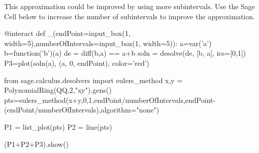 \documentclass{ximera}
\begin{document}
\begin{example}
 
This approximation could be improved by using more subintervals.  Use the Sage Cell below to increase the number of subintervals to improve the approximation.
 

\begin{sageCell}
@interact
def _(endPoint=input_box(1, width=5),numberOfIntervals=input_box(1, width=5)):
    a=var('a')
    b=function('b')(a)
    de = diff(b,a) ==  a+b
    soln = desolve(de, [b, a], ics=[0,1])
    P3=plot(soln(a), (a, 0, endPoint), color='red')

    from sage.calculus.desolvers import eulers_method
    x,y = PolynomialRing(QQ,2,"xy").gens()
    pts=eulers_method(x+y,0,1,endPoint/numberOfIntervals,endPoint-(endPoint/numberOfIntervals),algorithm="none")

    P1 = list_plot(pts)
    P2 = line(pts)

    (P1+P2+P3).show()
\end{sageCell}
 
\end{example}
 
\end{document}
